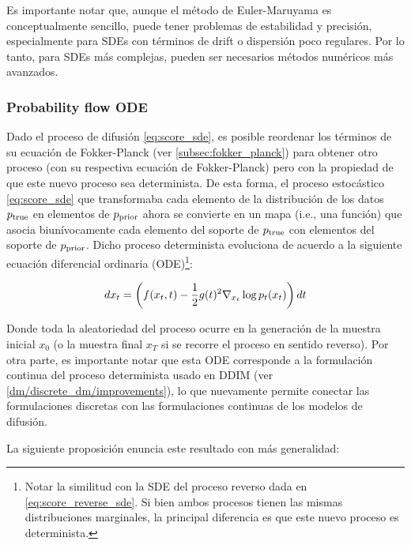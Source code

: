 Es importante notar que, aunque el método de Euler-Maruyama es conceptualmente sencillo, puede tener problemas de estabilidad y precisión, especialmente para SDEs con términos de drift o dispersión poco regulares. Por lo tanto, para SDEs más complejas, pueden ser necesarios métodos numéricos más avanzados.

\subsubsection{Probability flow ODE}

Dado el proceso de difusión \eqref{eq:score_sde}, es posible reordenar los términos de su ecuación de Fokker-Planck (ver \autoref{subsec:fokker_planck}) para obtener otro proceso (con su respectiva ecuación de Fokker-Planck) pero con la propiedad de que este nuevo proceso sea determinista. De esta forma, el proceso estocástico \eqref{eq:score_sde} que transformaba cada elemento de la distribución de los datos $p_{\operatorname{true}}$ en elementos de $p_{\operatorname{prior}}$ ahora se convierte en un mapa (i.e., una función) que asocia biunívocamente cada elemento del soporte de $p_{\operatorname{true}}$ con elementos del soporte de $p_{\operatorname{prior}}$. Dicho proceso determinista evoluciona de acuerdo a la siguiente ecuación diferencial ordinaria (ODE)\footnote{Notar la similitud con la SDE del proceso reverso dada en \eqref{eq:score_reverse_sde}. Si bien ambos procesos tienen las mismas distribuciones marginales, la principal diferencia es que este nuevo proceso es determinista.}:

\begin{equation}
    \label{eq:probability_flow_dm}
    dx_t = \left(f(x_t,t)-\frac{1}{2}g(t)^2\nabla_{x_t} \log p_t(x_t)\right)dt
\end{equation}

Donde toda la aleatoriedad del proceso ocurre en la generación de la muestra inicial $x_0$ (o la muestra final $x_T$ si se recorre el proceso en sentido reverso). Por otra parte, es importante notar que esta ODE corresponde a la formulación continua del proceso determinista usado en DDIM (ver \autoref{dm/discrete_dm/improvements}), lo que nuevamente permite conectar las formulaciones discretas con las formulaciones continuas de los modelos de difusión.

La siguiente proposición enuncia este resultado con más generalidad:

